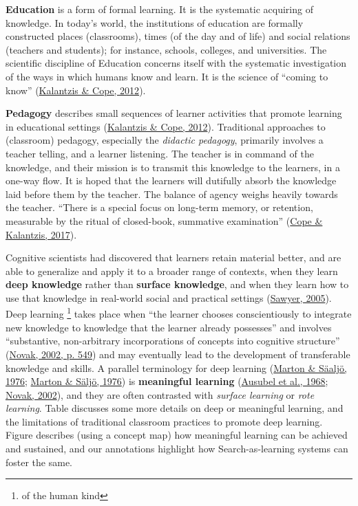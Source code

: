 \documentclass[letterpaper, nobind]{templates/ociamthesis}
\begin{document}
\textbf{Education} is a form of formal learning. It is the systematic
acquiring of knowledge. In today's world, the institutions of education
are formally constructed places (classrooms), times (of the day and of
life) and social relations (teachers and students); for instance,
schools, colleges, and universities. The scientific discipline of
Education concerns itself with the systematic investigation of the ways
in which humans know and learn. It is the science of ``coming to know''
(\protect\hyperlink{ref-kalantzis2012newa}{Kalantzis \& Cope, 2012}).

\textbf{Pedagogy} describes small sequences of learner activities that
promote learning in educational settings (\protect\hyperlink{ref-kalantzis2012newa}{Kalantzis \& Cope, 2012}).
Traditional approaches to (classroom) pedagogy, especially the \emph{didactic
pedagogy}, primarily involves a teacher telling, and a learner
listening. The teacher is in command of the knowledge, and their mission
is to transmit this knowledge to the learners, in a one-way flow. It is
hoped that the learners will dutifully absorb the knowledge laid before
them by the teacher. The balance of agency weighs heavily towards the
teacher. ``There is a special focus on long-term memory, or retention,
measurable by the ritual of closed-book, summative examination''
(\protect\hyperlink{ref-cope2017elearningc}{Cope \& Kalantzis, 2017}).

Cognitive scientists had discovered that learners retain material
better, and are able to generalize and apply it to a broader range of
contexts, when they learn \textbf{deep knowledge} rather than \textbf{surface
knowledge}, and when they learn how to use that knowledge in real-world
social and practical settings (\protect\hyperlink{ref-sawyer2005cambridge}{Sawyer, 2005}). Deep learning \footnote{
  of the human kind}
takes place when ``the learner chooses conscientiously to integrate new
knowledge to knowledge that the learner already possesses'' and involves
``substantive, non-arbitrary incorporations of concepts into cognitive
structure'' (\protect\hyperlink{ref-novak2002meaningful}{Novak, 2002, p. 549}) and may eventually lead to the
development of transferable knowledge and skills. A parallel terminology
for deep learning (\protect\hyperlink{ref-marton1976qualitative_b}{Marton \& Säaljö, 1976}; \protect\hyperlink{ref-marton1976qualitative_a}{Marton \& Säljö, 1976})
is \textbf{meaningful learning}
(\protect\hyperlink{ref-ausubel1968educational}{Ausubel et al., 1968}; \protect\hyperlink{ref-novak2002meaningful}{Novak, 2002}), and they are often
contrasted with \emph{surface learning} or \emph{rote learning}.
Table
discusses some more
details on deep or meaningful learning, and the limitations of
traditional classroom practices to promote deep learning.
Figure
describes (using a concept map) how
meaningful learning can be achieved and sustained, and our annotations
highlight how Search-as-learning systems can foster the same.
\end{document}
